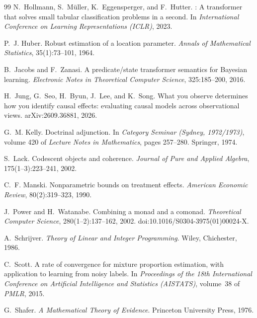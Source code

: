 \documentclass[11pt]{article}
\theoremstyle{definition}
\theoremstyle{remark}
\begin{document}
\begin{thebibliography}{99}
N.~Hollmann, S.~M\"uller, K.~Eggensperger, and F.~Hutter.
: A transformer that solves small tabular classification problems in a second.
\newblock In \emph{International Conference on Learning Representations (ICLR)}, 2023.

P.~J. Huber.
\newblock Robust estimation of a location parameter.
\newblock \emph{Annals of Mathematical Statistics}, 35(1):73--101, 1964.

B.~Jacobs and F.~Zanasi.
\newblock A predicate/state transformer semantics for {B}ayesian learning.
\newblock \emph{Electronic Notes in Theoretical Computer Science}, 325:185--200, 2016.

H.~Jung, G.~Seo, H.~Byun, J.~Lee, and K.~Song.
\newblock What you observe determines how you identify causal effects: evaluating causal models
  across observational views.
\newblock arXiv:2609.36881, 2026.

G.~M. Kelly.
\newblock Doctrinal adjunction.
\newblock In \emph{Category Seminar (Sydney, 1972/1973)}, volume 420 of \emph{Lecture Notes in
  Mathematics}, pages 257--280. Springer, 1974.

S.~Lack.
\newblock Codescent objects and coherence.
\newblock \emph{Journal of Pure and Applied Algebra}, 175(1--3):223--241, 2002.

C.~F. Manski.
\newblock Nonparametric bounds on treatment effects.
\newblock \emph{American Economic Review}, 80(2):319--323, 1990.

J.~Power and H.~Watanabe.
\newblock Combining a monad and a comonad.
\newblock \emph{Theoretical Computer Science}, 280(1--2):137--162, 2002.
\newblock doi:10.1016/S0304-3975(01)00024-X.

A.~Schrijver.
\newblock \emph{Theory of Linear and Integer Programming}.
\newblock Wiley, Chichester, 1986.

C.~Scott.
\newblock A rate of convergence for mixture proportion estimation, with application to learning from
  noisy labels.
\newblock In \emph{Proceedings of the 18th International Conference on Artificial Intelligence and
  Statistics (AISTATS)}, volume~38 of \emph{PMLR}, 2015.

G.~Shafer.
\newblock \emph{A Mathematical Theory of Evidence}.
\newblock Princeton University Press, 1976.


\end{thebibliography}
\end{document}
